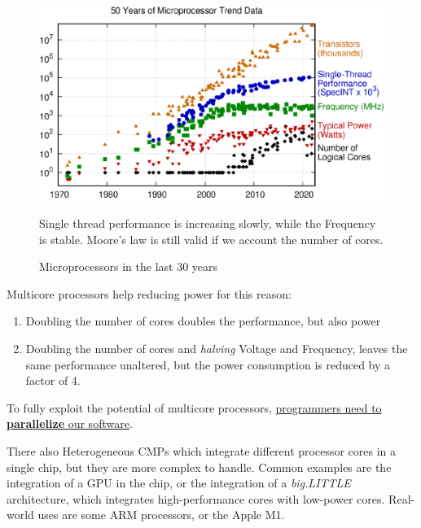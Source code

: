 \begin{figure}[htbp]
   \centering
   \includegraphics{images/01/cores_history.png}
   \caption{Microprocessors in the last 30 years}
   Single thread performance is increasing slowly, while the Frequency is stable.
   Moore's law is still valid if we account the number of cores.
   \label{fig:cores_history}
\end{figure}
{Multicore processors help reducing power for this reason:\ns
\begin{enumerate}
   \item Doubling the number of cores doubles the performance, but also power \smiley
   \item Doubling the number of cores and \textit{halving} Voltage and Frequency, leaves the same performance unaltered, but the power consumption is reduced by a factor of 4. \smiley
\end{enumerate}}

To fully exploit the potential of multicore processors, \ul{programmers need to \textbf{parallelize} our software}.

There also Heterogeneous CMPs which integrate different processor cores in a single chip, but they are more complex to handle. Common examples are the integration of a GPU in the chip, or the integration of a \textit{big.LITTLE} architecture, which integrates high-performance cores with low-power cores.
Real-world uses are some ARM processors, or the Apple M1.